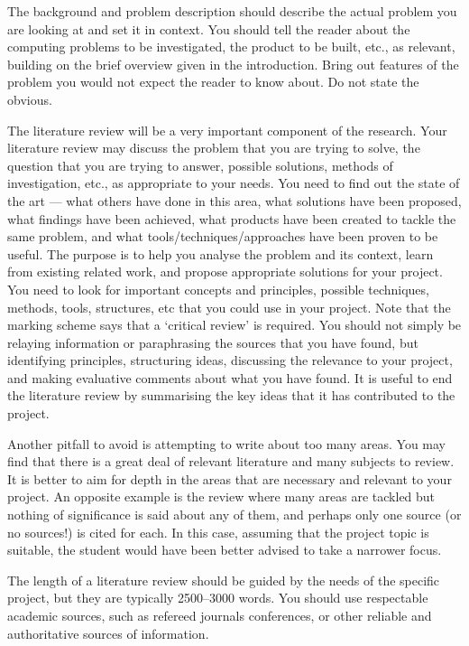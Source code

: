 {    The background and problem description should describe the actual problem you are looking at and set it in context. You should tell the reader about the computing problems
    to be investigated, the product to be built, etc., as relevant, building on the brief overview given in the introduction. Bring out features of the problem you would not
    expect the reader to know about. Do not state the obvious.

    The literature review will be a very important component of the research. Your literature review may discuss the problem that you are trying to solve, the question that
    you are trying to answer, possible solutions, methods of investigation, etc., as appropriate to your needs. You need to find out the state of the art --- what others have
    done in this area, what solutions have been proposed, what findings have been achieved, what products have been created to tackle the same problem, and what
    tools/techniques/approaches have been proven to be useful. The purpose is to help you analyse the problem and its context, learn from existing related work, and
    propose appropriate solutions for your project. You need to look for important concepts and principles, possible techniques, methods, tools, structures, etc that
    you could use in your project.
    Note that the marking scheme says that a \enquote*{critical review} is required. You should not simply be relaying information or paraphrasing the sources that you have found, but
    identifying principles, structuring ideas, discussing the relevance to your project, and making evaluative comments about what you have found. It is useful to end the
    literature review by summarising the key ideas that it has contributed to the project.

    Another pitfall to avoid is attempting to write about too many areas. You may find that there is a great deal of relevant literature and many subjects to review. It is
    better to aim for depth in the areas that are necessary and relevant to your project. An opposite example is the review where many areas are tackled but nothing
    of significance is said about any of them, and perhaps only one source (or no sources!) is cited for each. In this case, assuming that the project topic is suitable, the
    student would have been better advised to take a narrower focus.

    The length of a literature review should be guided by the needs of the specific project, but they are typically 2500--3000 words. You should use respectable academic sources,
    such as refereed journals conferences, or other reliable and authoritative sources of information.

}
